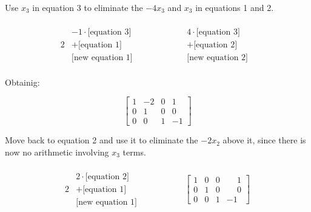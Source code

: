\documentclass{article}
\begin{document}
\noindent Use $x_3$ in equation 3 to eliminate the $-4x_3$ and $x_3$ in equations 1 and 2.

\begin{alignat*}{2}
    \begin{matrix} 
        \begin{split}
            -1\cdot\text{[equation 3]}\\
            +\text{[equation 1]}\\
            \hline
            \text{[new equation 1]}
        \end{split}
    \end{matrix}
    & \hspace{ 4em}%
    \begin{matrix}
        \begin{split}
            4\cdot\text{[equation 3]}\\
            +\text{[equation 2]}\\
            \hline
            \text{[new equation 2]}
        \end{split}
    \end{matrix}
\end{alignat*}

\noindent Obtainig:

\begin{equation*}
    \begin{bmatrix}
        1 & -2 & 0 & 1\\
        0 & 1 & 0 & 0\\
        0 & 0 & 1 & -1
    \end{bmatrix}
\end{equation*}

\noindent Move back to equation 2 and use it to eliminate the $-2x_2$ above it, since there is now no arithmetic involving $x_3$ terms.

\begin{alignat*}{2}
    \begin{matrix} 
        \begin{split}
            2\cdot\text{[equation 2]}\\
            +\text{[equation 1]}\\
            \hline
            \text{[new equation 1]}
        \end{split}
    \end{matrix}
    & \hspace{ 4em}%
    \begin{bmatrix}
        1 & 0 & 0 & \phantom{-}1\\
        0 & 1 & 0 & \phantom{-}0\\
        0 & 0 & 1 & -1
    \end{bmatrix}
\end{alignat*}
\end{document}
